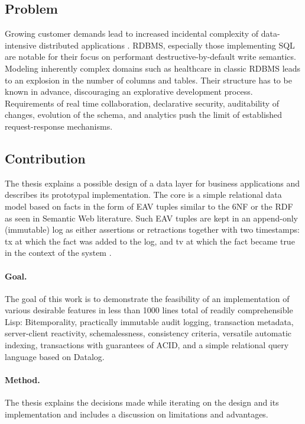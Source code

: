 \cleardoublepage

\subsection{Problem}
Growing customer demands lead to increased incidental complexity \cite{brooks1995mythical} of data-intensive distributed applications \cite{kleppmann2017designing}. \gls{RDBMS}, especially those implementing \gls{SQL} are notable for their focus on performant destructive-by-default write semantics. Modeling inherently complex domains such as healthcare in classic RDBMS leads to an explosion in the number of columns and tables. Their structure has to be known in advance, discouraging an explorative development process. Requirements of real time collaboration, declarative security, auditability of changes, evolution of the schema, and analytics push the limit of established request-response mechanisms.


\subsection{Contribution}
The thesis explains a possible design of a data layer for business applications and describes its prototypal implementation. The core is a simple relational data model based on facts in the form of \gls{EAV} tuples similar to the \gls{6NF} or the \gls{RDF} as seen in Semantic Web literature. Such EAV tuples are kept in an append-only (immutable) log as either assertions or retractions together with two timestamps: \gls{tx} at which the fact was added to the log, and \gls{tv} at which the fact became true in the context of the system \cite{snodgrass1992temporal}.


\paragraph{Goal.}
The goal of this work is to demonstrate the feasibility of an implementation of various desirable features in less than 1000 lines total of readily comprehensible Lisp: Bitemporality, practically immutable audit logging, transaction metadata, server-client reactivity, schemalessness, consistency criteria, versatile automatic indexing, transactions with guarantees of \gls{ACID}, and a simple relational query language based on Datalog.

\paragraph{Method.}
The thesis explains the decisions made while iterating on the design and its implementation and includes a discussion on limitations and advantages.

